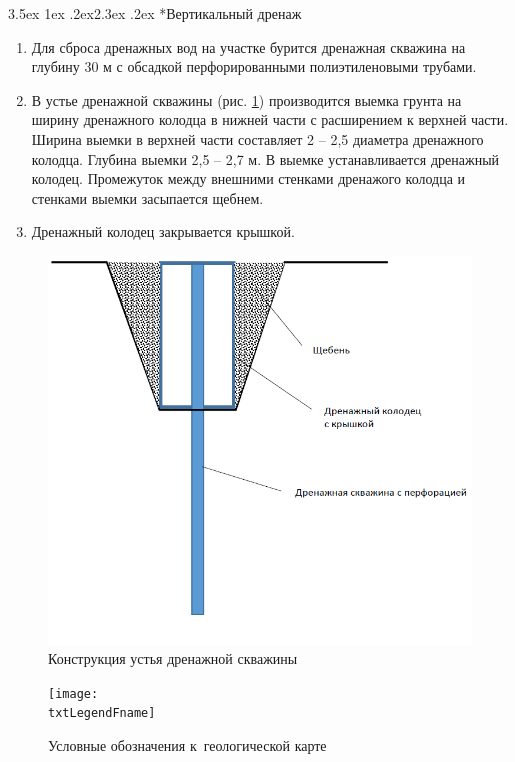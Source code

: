 \documentclass[a4paper,12pt]{article} %
\makeatletter
\renewcommand\subsection{\@startsection {subsection}{1}{\parindent}%
	{3.5ex \@plus 1ex \@minus .2ex}{2.3ex \@plus.2ex}%
	{\normalfont\hyphenpenalty=10000\large\bfseries}}
\newcommand{\txtLegendFname}{Legend-o-41-26.jpg}				%
\makeatother
\begin{document}
\subsection*{Вертикальный дренаж}
\begin{enumerate}
\item Для сброса дренажных вод на участке  бурится дренажная скважина на глубину 30 м с обсадкой перфорированными полиэтиленовыми трубами.
\item В устье дренажной скважины (рис. \ref{img:construction}) производится выемка грунта на ширину дренажного колодца в нижней части  с расширением к верхней части. Ширина выемки в верхней части составляет 2 – 2,5 диаметра дренажного колодца. Глубина выемки 2,5 – 2,7 м. В выемке устанавливается  дренажный колодец. Промежуток между внешними стенками дренажого колодца и стенками выемки засыпается щебнем.
\item Дренажный колодец закрывается крышкой.

\end{enumerate}
\begin{figure}[!h]
	\centering
	\includegraphics[width=\linewidth]{construction.png}
	\caption[Конструкция]{Конструкция устья дренажной скважины}
	\label{img:construction}
\end{figure}

\begin{figure}[!h]
	\centering
	\texttt{[image: \\txtLegendFname]}
	\caption[Условные обозначения]{Условные обозначения к~геологической карте}
	\label{img:legend}
\end{figure}
\end{document}

